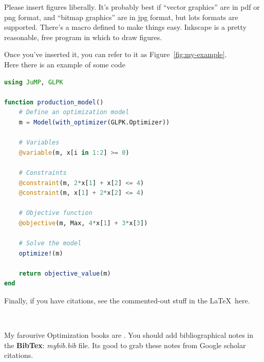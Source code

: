 \documentclass[12pt]{article}
\begin{document}
Please insert figures liberally.  It's probably best if ``vector graphics'' are in pdf or png format, and ``bitmap graphics'' are in jpg format, but lots formats are supported.  There's a macro defined to make things easy.  Inkscape is a pretty reasonable, free program in which to draw figures.
 
{}

Once you've inserted it, you can refer to it as Figure~\ref{fig:my-example}.\\

Here there is an example of some code
\begin{lstlisting}[language=Julia]
using JuMP, GLPK

function production_model()
    # Define an optimization model
    m = Model(with_optimizer(GLPK.Optimizer))
    
    # Variables
    @variable(m, x[i in 1:2] >= 0)
    
    # Constraints
    @constraint(m, 2*x[1] + x[2] <= 4)
    @constraint(m, x[1] + 2*x[2] <= 4)
    
    # Objective function
    @objective(m, Max, 4*x[1] + 3*x[3])
    
    # Solve the model
    optimize!(m)
    
    return objective_value(m)
end
\end{lstlisting}
Finally, if you have citations, see the commented-out stuff in the \LaTeX~here.

\

My farourive Optimization books are \cite{bertsimas1997introduction} \cite{boyd2004convex} \cite{wolsey2014integer}. You should add bibliographical notes in the \textbf{BibTex}: \textit{mybib.bib} file. Its good to grab these notes from Google scholar citations.

%


\end{document}
